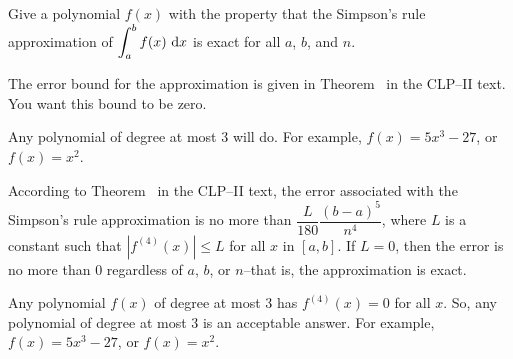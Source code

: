 \begin{question}
Give a polynomial $f(x)$ with the property that
 the Simpson's rule approximation of $\displaystyle\int_a^b f(x)~\mathrm{d}x$ is exact for all $a$, $b$, and $n$.
\end{question}
\begin{hint}
The error bound for the approximation is given in Theorem~ in the CLP--II text. You want this bound to be zero.
\end{hint}
\begin{answer}
Any polynomial of degree at most 3 will do. For example, $f(x)=5x^3-27$, or $f(x)=x^2$.
\end{answer}
\begin{solution}
According to Theorem~  in the CLP--II text, the error associated with the Simpson's rule approximation is no more than $\dfrac{L}{180}\dfrac{(b-a)^5}{n^4}$, where $L$ is a constant such that $|f^{(4)}(x)| \leq L$ for all $x$ in $[a,b]$. If $L=0$, then the error is no more than 0 regardless of $a$, $b$, or $n$--that is, the approximation is exact.

Any polynomial $f(x)$ of degree at most 3 has $f^{(4)}(x)=0$ for all $x$. So, any polynomial of degree at most 3 is an acceptable answer. For example, $f(x)=5x^3-27$, or $f(x)=x^2$.
\end{solution}



